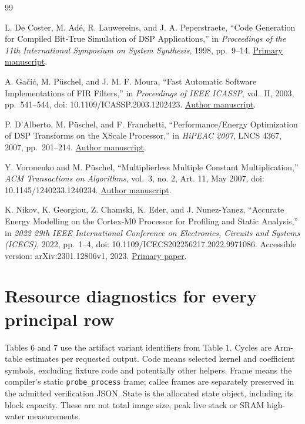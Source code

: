 \documentclass[conference]{IEEEtran}
\begin{document}
\begin{thebibliography}{99}

 L. De Coster, M. Adé, R. Lauwereins, and J. A. Peperstraete, ``Code
Generation for Compiled Bit-True Simulation of DSP Applications,'' in
\emph{Proceedings of the 11th International Symposium on System
Synthesis}, 1998, pp.~9--14.
\href{https://cecs.uci.edu/~papers/compendium94-03/papers/1998/isss98/pdffiles/1_2.pdf}{Primary
manuscript}.

 A. Gačić, M. Püschel, and J. M. F. Moura, ``Fast Automatic Software
Implementations of FIR Filters,'' in \emph{Proceedings of IEEE ICASSP},
vol.~II, 2003, pp.~541--544, doi: 10.1109/ICASSP.2003.1202423.
\href{https://users.ece.cmu.edu/~moura/papers/icassp03-gacic-pueschel-ieeexplore.pdf}{Author
manuscript}.

 P. D'Alberto, M. Püschel, and F. Franchetti, ``Performance/Energy
Optimization of DSP Transforms on the XScale Processor,'' in
\emph{HiPEAC 2007}, LNCS 4367, 2007, pp.~201--214.
\href{https://users.ece.cmu.edu/~franzf/papers/hipeac07.pdf}{Author
manuscript}.

 Y. Voronenko and M. Püschel, ``Multiplierless Multiple Constant
Multiplication,'' \emph{ACM Transactions on Algorithms}, vol.~3, no. 2,
Art. 11, May 2007, doi: 10.1145/1240233.1240234.
\href{https://spiral.ece.cmu.edu/pubs/synth.pdf}{Author manuscript}.

 K. Nikov, K. Georgiou, Z. Chamski, K. Eder, and J. Nunez-Yanez,
``Accurate Energy Modelling on the Cortex-M0 Processor for Profiling and
Static Analysis,'' in \emph{2022 29th IEEE International Conference on
Electronics, Circuits and Systems (ICECS)}, 2022, pp.~1--4, doi:
10.1109/ICECS202256217.2022.9971086. Accessible version:
arXiv:2301.12806v1, 2023.
\href{https://arxiv.org/html/2301.12806v1}{Primary paper}.

\end{thebibliography}

\appendices

\section{Resource diagnostics for every principal row}\label{appendix-a.-resource-diagnostics-for-every-principal-row}

Tables 6 and 7 use the artifact variant identifiers from Table 1. Cycles
are Arm-table estimates per requested output. Code means selected kernel
and coefficient symbols, excluding fixture code and potentially other
helpers. Frame means the compiler's static \texttt{probe\_process}
frame; callee frames are separately preserved in the admitted
verification JSON. State is the allocated state object, including its
block capacity. These are not total image size, peak live stack or SRAM
high-water measurements.
\end{document}
